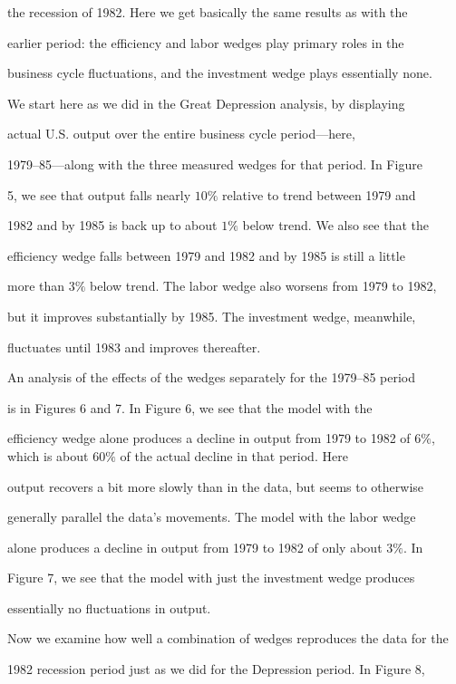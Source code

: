 \documentclass[fleqn,leqno,11pt]{article}
\begin{document}
the recession of 1982. Here we get basically the same results as with the

earlier period: the efficiency and labor wedges play primary roles in the

business cycle fluctuations, and the investment wedge plays essentially none.



We start here as we did in the Great Depression analysis, by displaying

actual U.S. output over the entire business cycle period---here,

1979--85---along with the three measured wedges for that period. In Figure

5, we see that output falls nearly $10\%$ relative to trend between 1979 and

1982 and by 1985 is back up to about $1\%$ below trend. We also see that the

efficiency wedge falls between 1979 and 1982 and by 1985 is still a little

more than $3\%$ below trend. The labor wedge also worsens from 1979 to 1982,

but it improves substantially by 1985. The investment wedge, meanwhile,

fluctuates until 1983 and improves thereafter.



An analysis of the effects of the wedges separately for the 1979--85 period

is in Figures 6 and 7. In Figure 6, we see that the model with the

efficiency wedge alone produces a decline in output from 1979 to 1982 of $%

6\% $, which is about $60\%$ of the actual decline in that period. Here

output recovers a bit more slowly than in the data, but seems to otherwise

generally parallel the data's movements. The model with the labor wedge

alone produces a decline in output from 1979 to 1982 of only about $3\%.$ In

Figure 7, we see that the model with just the investment wedge produces

essentially no fluctuations in output.



Now we examine how well a combination of wedges reproduces the data for the

1982 recession period just as we did for the Depression period. In Figure 8,
\end{document}
